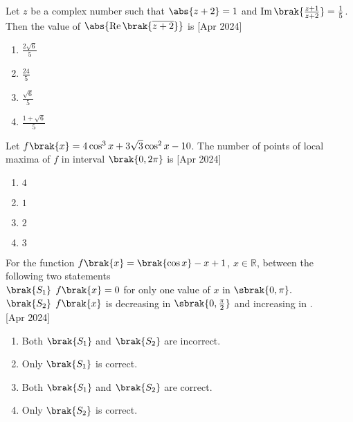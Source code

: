 	\item Let $z$ be a complex number such that $\abs{z+2}=1$ and $\operatorname{Im}\brak{\frac{z+1}{z+2}}=\frac{1}{5}$. Then the value of $\abs{\operatorname{Re}\brak{\overline{z+2}}}$ is \hfill{[Apr 2024]}
		\begin{enumerate}
			\item $\frac{2\sqrt{6}}{5}$\\
			\item $\frac{24}{5}$\\
			\item $\frac{\sqrt{6}}{5}$\\
			\item $\frac{1+\sqrt{6}}{5}$\\
		\end{enumerate}
	\item Let $f\brak{x}=4\cos^3{x}+3\sqrt{3}\cos^2{x}-10$. The number of points of local maxima of $f$ in interval $\brak{0,2\pi}$ is \hfill{[Apr 2024]}
		\begin{enumerate}
			\item $4$\\
			\item $1$\\
			\item $2$\\
			\item $3$\\
		\end{enumerate}
	\item For the function $f\brak{x}=\brak{\cos{x}}-x+1$, $x\in\mathbb{R}$, between the following two statements\\
		$\brak{S_1}$ $f\brak{x}=0$ for only one value of $x$ in $\sbrak{0,\pi}.$\\
		$\brak{S_2}$ $f\brak{x}$ is decreasing in $\sbrak{0,\frac{\pi}{2}}$ and increasing in .\\ \hfill{[Apr 2024]}
		\begin{enumerate}
			\item Both $\brak{S_1}$ and $\brak{S_2}$ are incorrect.\\
			\item Only $\brak{S_1}$ is correct.\\
			\item Both $\brak{S_1}$ and $\brak{S_2}$ are correct.\\
			\item Only $\brak{S_2}$ is correct.\\
		\end{enumerate}
